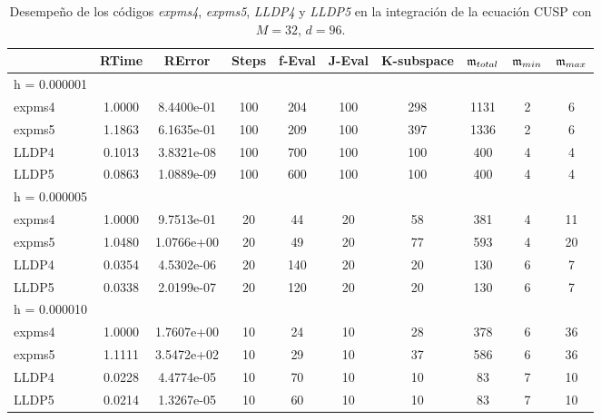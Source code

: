 \begin{table}[htb]
	\caption{Desempeño de los códigos \emph{expms4}, \emph{expms5}, \emph{LLDP4} y \emph{LLDP5} en la integración de la ecuación CUSP con $M=32$, $d=96$.}
	\centering
		\begin{tabular}{lccccccccc}
			\hline
			& RTime & RError & Steps & f-Eval & J-Eval & K-subspace & $\mathfrak{m}_{total}$ & $\mathfrak{m}_{min}$ & $\mathfrak{m}_{max}$ \\
			\hline
			h = 0.000001 &  &  &  &  &  &  &  &  &  \\
			expms4 & 1.0000 & 8.4400e-01 & 100 & 204 & 100 & 298 & 1131 & 2 & 6  \\
			expms5 & 1.1863 & 6.1635e-01 & 100 & 209 & 100 & 397 & 1336 & 2 & 6  \\
			LLDP4 & 0.1013 & 3.8321e-08 & 100 & 700 & 100 & 100 & 400 & 4 & 4  \\
			LLDP5 & 0.0863 & 1.0889e-09 & 100 & 600 & 100 & 100 & 400 & 4 & 4  \\
			\hline
			h = 0.000005 &  &  &  &  &  &  &  &  &  \\
			expms4 & 1.0000 & 9.7513e-01 & 20 & 44 & 20 & 58 & 381 & 4 & 11  \\
			expms5 & 1.0480 & 1.0766e+00 & 20 & 49 & 20 & 77 & 593 & 4 & 20  \\
			LLDP4 & 0.0354 & 4.5302e-06 & 20 & 140 & 20 & 20 & 130 & 6 & 7  \\
			LLDP5 & 0.0338 & 2.0199e-07 & 20 & 120 & 20 & 20 & 130 & 6 & 7  \\
			\hline
			h = 0.000010 &  &  &  &  &  &  &  &  &  \\
			expms4 & 1.0000 & 1.7607e+00 & 10 & 24 & 10 & 28 & 378 & 6 & 36  \\
			expms5 & 1.1111 & 3.5472e+02 & 10 & 29 & 10 & 37 & 586 & 6 & 36  \\
			LLDP4 & 0.0228 & 4.4774e-05 & 10 & 70 & 10 & 10 & 83 & 7 & 10  \\
			LLDP5 & 0.0214 & 1.3267e-05 & 10 & 60 & 10 & 10 & 83 & 7 & 10  \\
			\hline
		\end{tabular}
	\label{tab:num-exp-lldp-fix-step:cpna}
\end{table}



